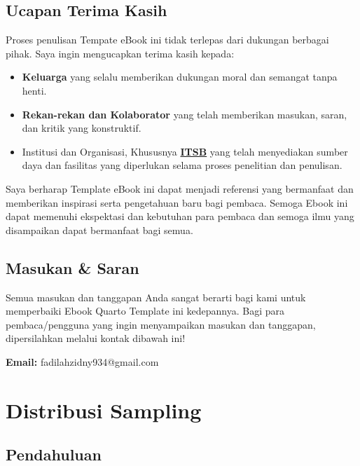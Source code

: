 \documentclass[
  indonesian,
  letterpaper,
]{book}
\providecommand{\tightlist}{%
  \setlength{\itemsep}{0pt}\setlength{\parskip}{0pt}}
\begin{document}
\section*{Ucapan Terima Kasih}\label{ucapan-terima-kasih}


Proses penulisan Tempate eBook ini tidak terlepas dari dukungan berbagai
pihak. Saya ingin mengucapkan terima kasih kepada:

\begin{itemize}
\tightlist
\item
  \textbf{Keluarga} yang selalu memberikan dukungan moral dan semangat
  tanpa henti.
\item
  \textbf{Rekan-rekan dan Kolaborator} yang telah memberikan masukan,
  saran, dan kritik yang konstruktif.
\item
  Institusi dan Organisasi, Khususnya
  \textbf{\href{https://itsb.ac.id/}{ITSB}} yang telah menyediakan
  sumber daya dan fasilitas yang diperlukan selama proses penelitian dan
  penulisan.
\end{itemize}

Saya berharap Template eBook ini dapat menjadi referensi yang bermanfaat
dan memberikan inspirasi serta pengetahuan baru bagi pembaca. Semoga
Ebook ini dapat memenuhi ekspektasi dan kebutuhan para pembaca dan
semoga ilmu yang disampaikan dapat bermanfaat bagi semua.

\section*{Masukan \& Saran}\label{masukan-saran}


Semua masukan dan tanggapan Anda sangat berarti bagi kami untuk
memperbaiki Ebook Quarto Template ini kedepannya. Bagi para
pembaca/pengguna yang ingin menyampaikan masukan dan tanggapan,
dipersilahkan melalui kontak dibawah ini!

\textbf{Email:} fadilahzidny934@gmail.com


\chapter{Distribusi Sampling}\label{distribusi-sampling}

\section{Pendahuluan}\label{pendahuluan}
\end{document}
